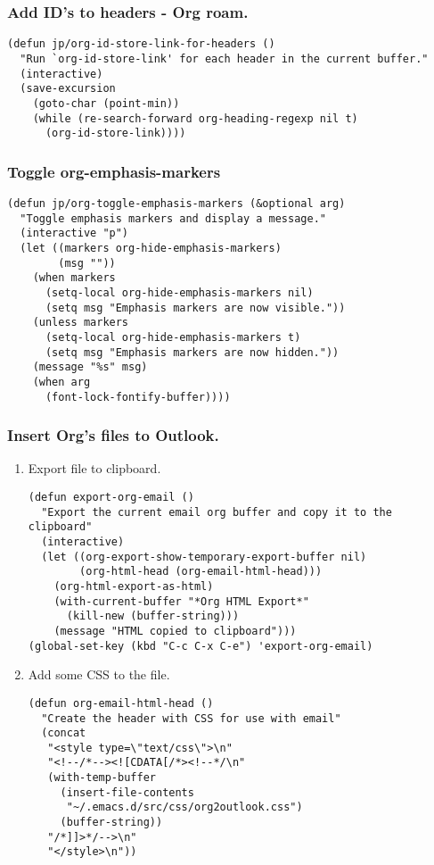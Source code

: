 \documentclass[11pt]{article}
\begin{document}
\subsubsection{Add ID's to headers - Org roam.}
\label{sec:orgeb515fc}
\begin{verbatim}
(defun jp/org-id-store-link-for-headers ()
  "Run `org-id-store-link' for each header in the current buffer."
  (interactive)
  (save-excursion
    (goto-char (point-min))
    (while (re-search-forward org-heading-regexp nil t)
      (org-id-store-link))))
\end{verbatim}
\subsubsection{Toggle org-emphasis-markers}
\label{sec:org9eb93ba}
\begin{verbatim}
(defun jp/org-toggle-emphasis-markers (&optional arg)
  "Toggle emphasis markers and display a message."
  (interactive "p")
  (let ((markers org-hide-emphasis-markers)
        (msg ""))
    (when markers
      (setq-local org-hide-emphasis-markers nil)
      (setq msg "Emphasis markers are now visible."))
    (unless markers
      (setq-local org-hide-emphasis-markers t)
      (setq msg "Emphasis markers are now hidden."))
    (message "%s" msg)
    (when arg
      (font-lock-fontify-buffer))))
\end{verbatim}
\subsubsection{Insert Org's files to Outlook.}
\label{sec:org28372ee}
\begin{enumerate}
\item Export file to clipboard.
\label{sec:orgc94f635}
\begin{verbatim}
(defun export-org-email ()
  "Export the current email org buffer and copy it to the
clipboard"
  (interactive)
  (let ((org-export-show-temporary-export-buffer nil)
        (org-html-head (org-email-html-head)))
    (org-html-export-as-html)
    (with-current-buffer "*Org HTML Export*"
      (kill-new (buffer-string)))
    (message "HTML copied to clipboard")))
(global-set-key (kbd "C-c C-x C-e") 'export-org-email)
\end{verbatim}
\item Add some CSS to the file.
\label{sec:org537cf71}
\begin{verbatim}
(defun org-email-html-head ()
  "Create the header with CSS for use with email"
  (concat
   "<style type=\"text/css\">\n"
   "<!--/*--><![CDATA[/*><!--*/\n"
   (with-temp-buffer
     (insert-file-contents
      "~/.emacs.d/src/css/org2outlook.css")
     (buffer-string))
   "/*]]>*/-->\n"
   "</style>\n"))
\end{verbatim}
\end{enumerate}
\end{document}
